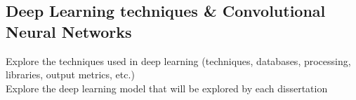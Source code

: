 \documentclass[letterpaper,12pt]{article}
\begin{document}
\subsection{Deep Learning techniques \& Convolutional Neural Networks}
Explore the techniques used in deep learning (techniques, databases, processing, libraries, output metrics, etc.)\\
Explore the deep learning model that will be explored by each dissertation




\begin{appendices}

\clearpage



\end{appendices}
\end{document}
